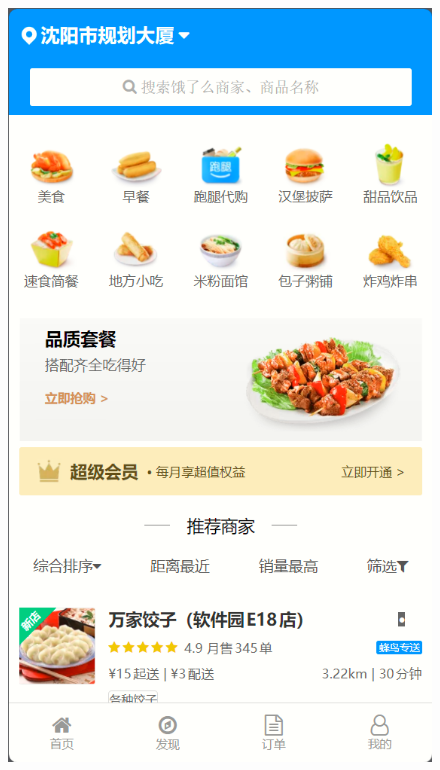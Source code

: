 \begin{figure}[h]
    \centering
    \begin{minipage}[b]{0.3\linewidth}
        \includegraphics[width=\linewidth]{uiFigs/首页.png}
     \end{minipage}
    \begin{minipage}[b]{0.3\linewidth}

\end{minipage}
\end{figure}
